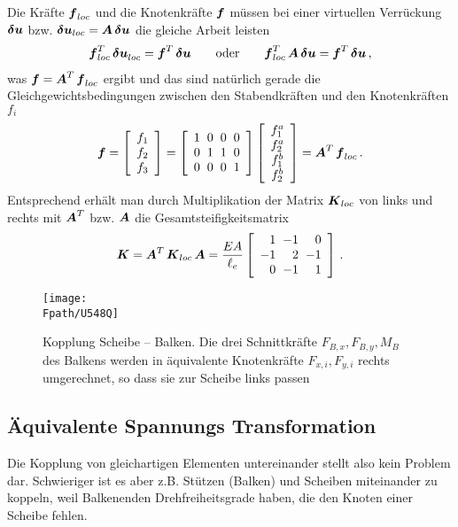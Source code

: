 Die Kr\"{a}fte $\mbox{\boldmath $f$}_{loc}$ und die Knotenkr\"{a}fte $\mbox{\boldmath $f$}$ m\"{u}ssen bei einer virtuellen Verr\"{u}ckung $\mbox{\boldmath $\delta$} \mbox{\boldmath $u$}$ bzw. $\mbox{\boldmath $\delta$} \mbox{\boldmath $u$}_{loc} = \mbox{\boldmath $A$}\,\mbox{\boldmath $\delta$} \mbox{\boldmath $u$}$ die gleiche Arbeit leisten
\begin{align}
\mbox{\boldmath $f$}_{loc}^T\,\mbox{\boldmath $\delta$} \mbox{\boldmath $u$}_{loc}^{\vphantom{T}} = \mbox{\boldmath $f$}^T\,\mbox{\boldmath $\delta$} \mbox{\boldmath $u$} \qquad \text{oder} \qquad \mbox{\boldmath $f$}_{loc}^T\,\mbox{\boldmath $A$}\,\mbox{\boldmath $\delta$}\mbox{\boldmath $u$} = \mbox{\boldmath $f$}^T\,\mbox{\boldmath $\delta$}\mbox{\boldmath $u$}\,,
\end{align}
was $\mbox{\boldmath $f$} = \mbox{\boldmath $A$}^T\,\mbox{\boldmath $f$}_{loc}$ ergibt und das sind nat\"{u}rlich gerade die Gleichgewichtsbedingungen zwischen den Stabendkr\"{a}ften und den Knotenkr\"{a}ften $f_i$
\begin{align}
\vek f = \left[ \barr{c} f_1 \\ f_2 \\ f_3 \earr \right] = \left [
\barr {r @{\hspace{2mm}} r @{\hspace{2mm}} r @{\hspace{2mm}} r} 1 & 0 & 0 & 0 \\ 0 & 1 & 1 & 0 \\ 0 & 0 & 0 & 1 \earr \right] \left[ \barr{c} f_1^a \\ f_2^a \\ f_1^b \\ f_2^b \earr \right] = \vek A^T\,\vek f_{loc}\,.
\end{align}
Entsprechend erh\"{a}lt man durch Multiplikation der Matrix $\mbox{\boldmath $K$}_{loc}$ von links und rechts mit
$\mbox{\boldmath $A$}^T$ bzw. $\mbox{\boldmath $A$}$ die Gesamtsteifigkeitsmatrix
\begin{align}
\vek K = \vek A^T\,\vek K_{loc}\,\vek A = \frac{EA}{\ell_e} \left [
\barr {r @{\hspace{2mm}} r @{\hspace{2mm}} r} 1 & -1 & 0  \\ -1 & 2 &-1 \\ 0 &-1 &1\earr \right]\,.
\end{align}

\begin{figure}[tbp]
\if {} \sidecaption[t] \fi
\centering
\texttt{[image: \\Fpath/U548Q]}
\caption{Kopplung Scheibe -- Balken. Die drei Schnittkr\"{a}fte $F_{B,x}, F_{B,y}, M_B$ des Balkens werden in \"{a}quivalente Knotenkr\"{a}fte $F_{x,i}, F_{y,i}$ rechts umgerechnet, so dass sie zur Scheibe links passen \cite{Werkle3} }
\label{U548}
\end{figure}%
\textcolor{chapterTitleBlue}{\section{\"{A}quivalente Spannungs Transformation}}\label{AST}
Die Kopplung von gleichartigen Elementen untereinander stellt also kein Problem dar. Schwieriger ist es aber z.B. St\"{u}tzen (Balken) und Scheiben miteinander zu koppeln, weil Balkenenden Drehfreiheitsgrade haben, die den Knoten einer Scheibe fehlen.

